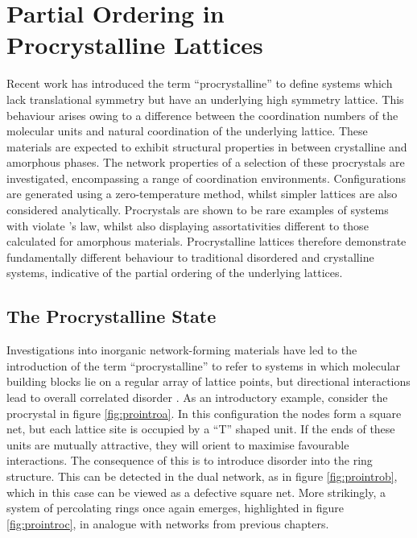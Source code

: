 \chapter[Partial Ordering in Procrystalline Lattices]{Partial Ordering in \\ Procrystalline Lattices} 
\label{ch:procrystals}

\begin{chapterabstract}
Recent work has introduced the term ``procrystalline'' to define systems which lack translational symmetry but have an underlying high symmetry lattice.
This behaviour arises owing to a difference between the coordination numbers of the molecular units and natural coordination of the underlying lattice.
These materials are expected to exhibit structural properties in between crystalline and amorphous phases.
The network properties of a selection of these procrystals are investigated, encompassing a range of coordination environments.
Configurations are generated using a zero\--temperature \mc{} method, whilst simpler lattices are also considered analytically.
Procrystals are shown to be rare examples of systems with violate \lm{}'s law, whilst also displaying assortativities different to those calculated for amorphous materials.
Procrystalline lattices therefore demonstrate fundamentally different behaviour to traditional disordered and crystalline systems, indicative of the partial ordering of the underlying lattices.
\end{chapterabstract}

\section{The Procrystalline State}

Investigations into inorganic network\--forming materials have led to the introduction of the term ``procrystalline'' to refer to systems in which molecular building blocks lie on a regular array of lattice points, but directional interactions lead to overall correlated disorder \cite{Overy2016}.
As an introductory example, consider the procrystal in figure \ref{fig:prointroa}.
In this configuration the nodes form a square net, but each lattice site is occupied by a ``T'' shaped unit.
If the ends of these units are mutually attractive, they will orient to maximise favourable interactions.
The consequence of this is to introduce disorder into the ring structure.
This can be detected in the dual network, as in figure \ref{fig:prointrob}, which in this case can be viewed as a defective square net.
More strikingly, a system of percolating rings once again emerges, highlighted in figure \ref{fig:prointroc}, in analogue with networks from previous chapters. 

